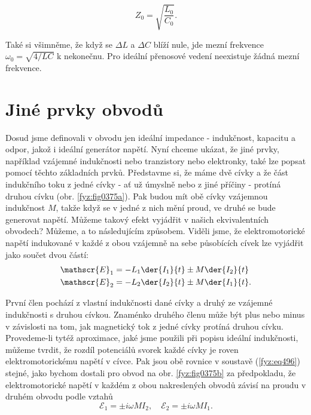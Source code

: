   \begin{equation}\label{fyz:eq502}
    Z_0 = \sqrt{\dfrac{L_0}{C_0}}.
  \end{equation}
  
  Také si všimněme, že když se \(\Delta L\) a \(\Delta C\) blíží nule, jde mezní frekvence 
  \(\omega_0 = \sqrt{4/LC}\) k nekonečnu. Pro ideální přenosové vedení neexistuje žádná mezní 
  frekvence.
  
\section{Jiné prvky obvodů}\label{fyz:IIchapXXIIsecVIII}
  Dosud jsme definovali v obvodu jen ideální impedance - indukčnost, kapacitu a odpor, jakož i 
  ideální generátor napětí. Nyní chceme ukázat, že jiné prvky, například vzájemné indukčnosti nebo 
  tranzistory nebo elektronky, také lze popsat pomocí těchto základních prvků. Představme si, že 
  máme dvě cívky a že část indukčního toku z jedné cívky - ať už úmyslně nebo z jiné příčiny - 
  protíná druhou cívku (obr. \ref{fyz:fig0375a}). Pak budou mít obě cívky vzájemnou indukčnost 
  \(M\), takže když se v jedné z nich mění proud, ve druhé se bude generovat napětí. Můžeme takový 
  efekt vyjádřit v našich ekvivalentních obvodech? Můžeme, a to následujícím způsobem. Viděli jsme, 
  že elektromotorické napětí indukované v každé z obou vzájemně na sebe působících cívek lze 
  vyjádřit jako součet dvou částí:
  \begin{subequations}\label{fyz:eq496}
    \begin{align}
      \mathscr{E}_1 &=-L_1\der{I_1}{t}\pm M\der{I_2}{t}      \label{fyz:eq497a} \\
      \mathscr{E}_2 &=-L_2\der{I_2}{t}\pm M\der{I_1}{t}.     \label{fyz:eq497b}
    \end{align}
  \end{subequations}

  První člen pochází z vlastní indukčnosti dané cívky a druhý ze vzájemné indukčnosti s druhou 
  cívkou. Znaménko druhého členu může být plus nebo minus v závislosti na tom, jak magnetický tok z 
  jedné cívky protíná druhou cívku. Provedeme-li tytéž aproximace, jaké jsme použili při popisu 
  ideální indukčnosti, můžeme tvrdit, že rozdíl potenciálů svorek každé cívky je roven 
  elektromotorickému napětí v cívce. Pak jsou obě rovnice v soustavě (\ref{fyz:eq496}) stejné, jako 
  bychom dostali pro obvod na obr. \ref{fyz:fig0375b} za předpokladu, že elektromotorické napětí v 
  každém z obou nakreslených obvodů závisí na proudu v druhém obvodu podle vztahů
  \begin{equation}\label{fyz:eq497}
    \mathscr{E}_1 = \pm i\omega MI_2, \quad \mathscr{E}_2 = \pm i\omega MI_1.
  \end{equation}
  
